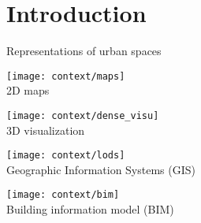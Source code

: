 \section{Introduction}

\begin{frame}{Representations of urban spaces}
	\centering
	\scriptsize
	
	\begin{minipage}{0.5\linewidth}
		\centering
		\texttt{[image: context/maps]}\\
		2D maps
	\end{minipage}%
	\begin{minipage}{0.5\linewidth}
		\centering
		\texttt{[image: context/dense\_visu]}\\
		3D visualization
	\end{minipage}
	
	\begin{minipage}{0.5\linewidth}
		\centering
		\texttt{[image: context/lods]}\\
		Geographic Information Systems (GIS)
	\end{minipage}%
	\begin{minipage}{0.5\linewidth}
		\centering
		\texttt{[image: context/bim]}\\
		Building information model (BIM)
	\end{minipage}
\end{frame}

